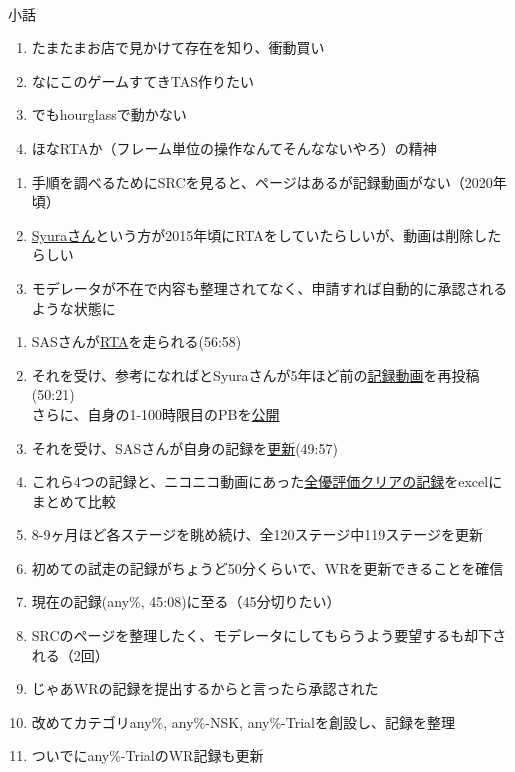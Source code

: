 \clearpage
~\vfill
\begin{\Columnname}{小話}
\begin{enumerate}[label={\sarrow}]
\item たまたまお店で見かけて存在を知り、衝動買い

\tcbline*
\item なにこのゲームすてきTAS作りたい
\item でもhourglassで動かない
\item ほなRTAか（フレーム単位の操作なんてそんなないやろ）の精神
\end{enumerate}

\tcbline*
\begin{enumerate}[label={\sarrow}]
\item 手順を調べるためにSRCを見ると、ページはあるが記録動画がない（2020年頃）
\item \href{https://www.speedrun.com/users/Syura}{Syuraさん}という方が2015年頃にRTAをしていたらしいが、動画は削除したらしい
\item モデレータが不在で内容も整理されてなく、申請すれば自動的に承認されるような状態に
\end{enumerate}

\tcbline*
\begin{enumerate}[label={\sarrow}]
\item SASさんが\href{https://www.speedrun.com/komeiji_satori_no_jousou_kyouiku/runs/znol46vy}{RTA}を走られる(56:58)
\item それを受け、参考になればとSyuraさんが5年ほど前の\href{https://www.speedrun.com/komeiji_satori_no_jousou_kyouiku/runs/m3n4v8qy}{記録動画}を再投稿(50:21)\\
      さらに、自身の1-100時限目のPBを\href{https://pastebin.com/0nH3mJSZ}{公開}
\item それを受け、SASさんが自身の記録を\href{https://www.speedrun.com/komeiji_satori_no_jousou_kyouiku/runs/m3ro3edm}{更新}(49:57)

\tcbline*
\item これら4つの記録と、ニコニコ動画にあった\href{https://www.nicovideo.jp/watch/sm18710850}{全優評価クリアの記録}をexcelにまとめて比較
\item 8-9ヶ月ほど各ステージを眺め続け、全120ステージ中119ステージを更新
\item 初めての試走の記録がちょうど50分くらいで、WRを更新できることを確信
\item 現在の記録(any\%, 45:08)に至る（45分切りたい）

\tcbline*
\item SRCのページを整理したく、モデレータにしてもらうよう要望するも却下される（2回）
\item じゃあWRの記録を提出するからと言ったら承認された
\item 改めてカテゴリany\%, any\%-NSK, any\%-Trialを創設し、記録を整理
\item ついでにany\%-TrialのWR記録も更新


\end{enumerate}
\end{\Columnname}
